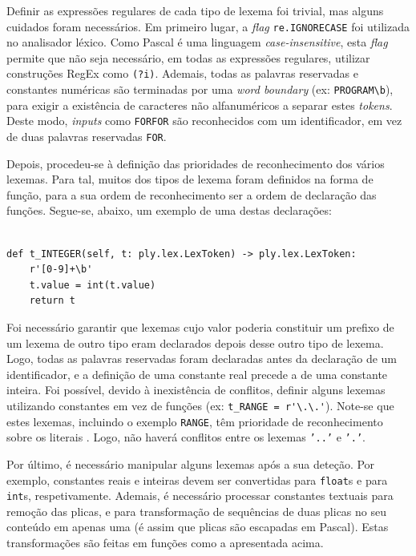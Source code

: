 \documentclass[12pt, a4paper]{article}
\begin{document}
Definir as expressões regulares de cada tipo de lexema foi trivial, mas alguns cuidados foram
necessários. Em primeiro lugar, a \emph{flag} \texttt{re.IGNORECASE} foi utilizada no analisador
léxico. Como Pascal é uma linguagem \emph{case-insensitive}, esta \emph{flag} permite que não seja
necessário, em todas as expressões regulares, utilizar construções RegEx como \texttt{(?i)}.
Ademais, todas as palavras reservadas e constantes numéricas são terminadas por uma
\emph{word boundary} (ex: \verb|PROGRAM\b|), para exigir a existência de caracteres não
alfanuméricos a separar estes \emph{tokens}. Deste modo, \emph{inputs} como \texttt{FORFOR} são
reconhecidos com um identificador, em vez de duas palavras reservadas \texttt{FOR}.

Depois, procedeu-se à definição das prioridades de reconhecimento dos vários lexemas. Para tal,
muitos dos tipos de lexema foram definidos na forma de função, para a sua ordem de reconhecimento
ser a ordem de declaração das funções. Segue-se, abaixo, um exemplo de uma destas declarações:

\begin{lstlisting}

def t_INTEGER(self, t: ply.lex.LexToken) -> ply.lex.LexToken:
    r'[0-9]+\b'
    t.value = int(t.value)
    return t
\end{lstlisting}

Foi necessário garantir que lexemas cujo valor poderia constituir um prefixo de um lexema de outro
tipo eram declarados depois desse outro tipo de lexema. Logo, todas as palavras reservadas foram
declaradas antes da declaração de um identificador, e a definição de uma constante real precede a de
uma constante inteira. Foi possível, devido à inexistência de conflitos, definir alguns lexemas
utilizando constantes em vez de funções (ex: \verb|t_RANGE = r'\.\.'|). Note-se que estes lexemas,
incluindo o exemplo \texttt{RANGE}, têm prioridade de reconhecimento sobre os literais \cite{ply}.
Logo, não haverá conflitos entre os lexemas \texttt{'..'} e \texttt{'.'}.

Por último, é necessário manipular alguns lexemas após a sua deteção. Por exemplo, constantes reais
e inteiras devem ser convertidas para \texttt{float}s e para \texttt{int}s, respetivamente. Ademais,
é necessário processar constantes textuais para remoção das plicas, e para transformação de
sequências de duas plicas no seu conteúdo em apenas uma (é assim que plicas são escapadas em
Pascal). Estas transformações são feitas em funções como a apresentada acima.
\end{document}
